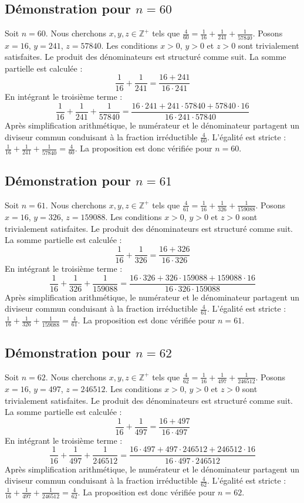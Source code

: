 \documentclass[11pt,a4paper]{article}
\begin{document}
\subsection{Démonstration pour $n = 60$}
Soit $n = 60$. Nous cherchons $x, y, z \in \mathbb{Z}^{+}$ tels que $\frac{4}{60} = \frac{1}{16} + \frac{1}{241} + \frac{1}{57840}$.
Posons $x = 16$, $y = 241$, $z = 57840$.
Les conditions $x > 0$, $y > 0$ et $z > 0$ sont trivialement satisfaites.
Le produit des dénominateurs est structuré comme suit. La somme partielle est calculée :
$$ \frac{1}{16} + \frac{1}{241} = \frac{16+241}{16 \cdot 241} $$
En intégrant le troisième terme :
$$ \frac{1}{16} + \frac{1}{241} + \frac{1}{57840} = \frac{16 \cdot 241 + 241 \cdot 57840 + 57840 \cdot 16}{16 \cdot 241 \cdot 57840} $$
Après simplification arithmétique, le numérateur et le dénominateur partagent un diviseur commun conduisant à la fraction irréductible $\frac{4}{60}$.
L'égalité est stricte : $\frac{1}{16} + \frac{1}{241} + \frac{1}{57840} = \frac{4}{60}$.
La proposition est donc vérifiée pour $n = 60$.
\subsection{Démonstration pour $n = 61$}
Soit $n = 61$. Nous cherchons $x, y, z \in \mathbb{Z}^{+}$ tels que $\frac{4}{61} = \frac{1}{16} + \frac{1}{326} + \frac{1}{159088}$.
Posons $x = 16$, $y = 326$, $z = 159088$.
Les conditions $x > 0$, $y > 0$ et $z > 0$ sont trivialement satisfaites.
Le produit des dénominateurs est structuré comme suit. La somme partielle est calculée :
$$ \frac{1}{16} + \frac{1}{326} = \frac{16+326}{16 \cdot 326} $$
En intégrant le troisième terme :
$$ \frac{1}{16} + \frac{1}{326} + \frac{1}{159088} = \frac{16 \cdot 326 + 326 \cdot 159088 + 159088 \cdot 16}{16 \cdot 326 \cdot 159088} $$
Après simplification arithmétique, le numérateur et le dénominateur partagent un diviseur commun conduisant à la fraction irréductible $\frac{4}{61}$.
L'égalité est stricte : $\frac{1}{16} + \frac{1}{326} + \frac{1}{159088} = \frac{4}{61}$.
La proposition est donc vérifiée pour $n = 61$.
\subsection{Démonstration pour $n = 62$}
Soit $n = 62$. Nous cherchons $x, y, z \in \mathbb{Z}^{+}$ tels que $\frac{4}{62} = \frac{1}{16} + \frac{1}{497} + \frac{1}{246512}$.
Posons $x = 16$, $y = 497$, $z = 246512$.
Les conditions $x > 0$, $y > 0$ et $z > 0$ sont trivialement satisfaites.
Le produit des dénominateurs est structuré comme suit. La somme partielle est calculée :
$$ \frac{1}{16} + \frac{1}{497} = \frac{16+497}{16 \cdot 497} $$
En intégrant le troisième terme :
$$ \frac{1}{16} + \frac{1}{497} + \frac{1}{246512} = \frac{16 \cdot 497 + 497 \cdot 246512 + 246512 \cdot 16}{16 \cdot 497 \cdot 246512} $$
Après simplification arithmétique, le numérateur et le dénominateur partagent un diviseur commun conduisant à la fraction irréductible $\frac{4}{62}$.
L'égalité est stricte : $\frac{1}{16} + \frac{1}{497} + \frac{1}{246512} = \frac{4}{62}$.
La proposition est donc vérifiée pour $n = 62$.
\end{document}
